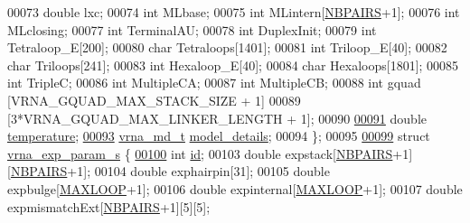 \begin{DoxyCode}
00073   \textcolor{keywordtype}{double}  lxc;
00074   \textcolor{keywordtype}{int}     MLbase;
00075   \textcolor{keywordtype}{int}     MLintern[\hyperlink{energy__const_8h_a5e75221c779d618eab81e096f37e32ce}{NBPAIRS}+1];
00076   \textcolor{keywordtype}{int}     MLclosing;
00077   \textcolor{keywordtype}{int}     TerminalAU;
00078   \textcolor{keywordtype}{int}     DuplexInit;
00079   \textcolor{keywordtype}{int}     Tetraloop\_E[200];
00080   \textcolor{keywordtype}{char}    Tetraloops[1401];
00081   \textcolor{keywordtype}{int}     Triloop\_E[40];
00082   \textcolor{keywordtype}{char}    Triloops[241];
00083   \textcolor{keywordtype}{int}     Hexaloop\_E[40];
00084   \textcolor{keywordtype}{char}    Hexaloops[1801];
00085   \textcolor{keywordtype}{int}     TripleC;
00086   \textcolor{keywordtype}{int}     MultipleCA;
00087   \textcolor{keywordtype}{int}     MultipleCB;
00088   \textcolor{keywordtype}{int}     gquad [VRNA\_GQUAD\_MAX\_STACK\_SIZE + 1]
00089                 [3*VRNA\_GQUAD\_MAX\_LINKER\_LENGTH + 1];
00090 
\hypertarget{params_8h_source.tex_l00091}{}\hyperlink{group__energy__parameters_aeed2cd83713012bcb52e431041e037c8}{00091}   \textcolor{keywordtype}{double}  \hyperlink{group__energy__parameters_aeed2cd83713012bcb52e431041e037c8}{temperature};            
\hypertarget{params_8h_source.tex_l00093}{}\hyperlink{group__energy__parameters_a7b84353eb9075c595bad4ceb871bcae7}{00093}   \hyperlink{structvrna__md__s}{vrna\_md\_t} \hyperlink{group__energy__parameters_a7b84353eb9075c595bad4ceb871bcae7}{model\_details};   
00094 \};
00095 
\hypertarget{params_8h_source.tex_l00099}{}\hyperlink{group__energy__parameters}{00099} \textcolor{keyword}{struct }\hyperlink{group__energy__parameters_structvrna__exp__param__s}{vrna\_exp\_param\_s} \{
\hypertarget{params_8h_source.tex_l00100}{}\hyperlink{group__energy__parameters_a378d5bcf2bae1f3ec84c912c7d3908d2}{00100}   \textcolor{keywordtype}{int}     \hyperlink{group__energy__parameters_a378d5bcf2bae1f3ec84c912c7d3908d2}{id};   
00103   \textcolor{keywordtype}{double}  expstack[\hyperlink{energy__const_8h_a5e75221c779d618eab81e096f37e32ce}{NBPAIRS}+1][\hyperlink{energy__const_8h_a5e75221c779d618eab81e096f37e32ce}{NBPAIRS}+1];
00104   \textcolor{keywordtype}{double}  exphairpin[31];
00105   \textcolor{keywordtype}{double}  expbulge[\hyperlink{energy__const_8h_ad1bd6eabac419670ddd3c9ed82145988}{MAXLOOP}+1];
00106   \textcolor{keywordtype}{double}  expinternal[\hyperlink{energy__const_8h_ad1bd6eabac419670ddd3c9ed82145988}{MAXLOOP}+1];
00107   \textcolor{keywordtype}{double}  expmismatchExt[\hyperlink{energy__const_8h_a5e75221c779d618eab81e096f37e32ce}{NBPAIRS}+1][5][5];

\end{DoxyCode}
